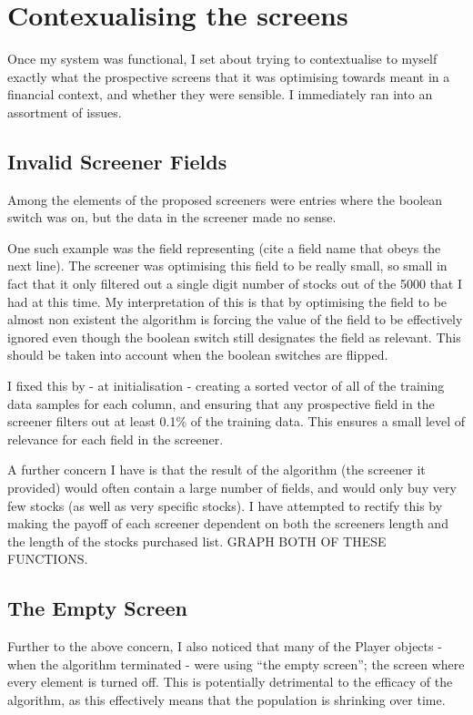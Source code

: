 \section{Contexualising the screens} \label{contextualising}
Once my system was functional, I set about trying to contextualise to myself exactly what the prospective screens that it was optimising towards meant in a financial context, and whether they were sensible. I immediately ran into an assortment of issues.

\subsection{Invalid Screener Fields} \label{invalidField}
Among the elements of the proposed screeners were entries where the boolean switch was on, but the data in the screener made no sense. \newline

One such example was the field representing (cite a field name that obeys the next line). The screener was optimising this field to be really small, so small in fact that it only filtered out a single digit number of stocks out of the 5000 that I had at this time. My interpretation of this is that by optimising the field to be almost non existent the algorithm is forcing the value of the field to be effectively ignored even though the boolean switch still designates the field as relevant. This should be taken into account when the boolean switches are flipped. \newline

I fixed this by - at initialisation - creating a sorted vector of all of the training data samples for each column, and ensuring that any prospective field in the screener filters out at least 0.1\% of the training data. This ensures a small level of relevance for each field in the screener. \newline

A further concern I have is that the result of the algorithm (the screener it provided) would often contain a large number of fields, and would only buy very few stocks (as well as very specific stocks). I have attempted to rectify this by making the payoff of each screener dependent on both the screeners length and the length of the stocks purchased list. GRAPH BOTH OF THESE FUNCTIONS.

\subsection{The Empty Screen}
Further to the above concern, I also noticed that many of the Player objects - when the algorithm terminated - were using ``the empty screen''; the screen where every element is turned off. This is potentially detrimental to the efficacy of the algorithm, as this effectively means that the population is shrinking over time. \newline

